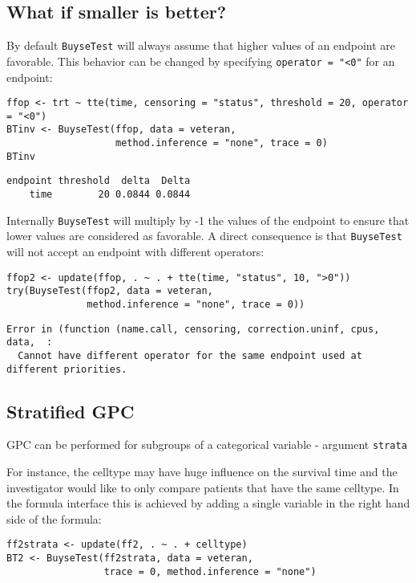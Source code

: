 \documentclass[12pt]{article}
\begin{document}
\clearpage

\subsection{What if smaller is better?}
\label{sec:orgaab0aa0}
By default \texttt{BuyseTest} will always assume that higher values of an
endpoint are favorable. This behavior can be changed by specifying \texttt{operator = "<0"}
for an endpoint:
\lstset{language=r,label= ,caption= ,captionpos=b,numbers=none}
\begin{lstlisting}
ffop <- trt ~ tte(time, censoring = "status", threshold = 20, operator = "<0")
BTinv <- BuyseTest(ffop, data = veteran, 
				   method.inference = "none", trace = 0)
BTinv
\end{lstlisting}

\begin{verbatim}
endpoint threshold  delta  Delta
    time        20 0.0844 0.0844
\end{verbatim}

Internally \texttt{BuyseTest} will multiply by -1 the values of the endpoint
to ensure that lower values are considered as favorable. A direct
consequence is that \texttt{BuyseTest} will not accept an endpoint with
different operators:
\lstset{language=r,label= ,caption= ,captionpos=b,numbers=none}
\begin{lstlisting}
ffop2 <- update(ffop, . ~ . + tte(time, "status", 10, ">0"))
try(BuyseTest(ffop2, data = veteran, 
			  method.inference = "none", trace = 0))
\end{lstlisting}

\begin{verbatim}
Error in (function (name.call, censoring, correction.uninf, cpus, data,  : 
  Cannot have different operator for the same endpoint used at different priorities.
\end{verbatim}

\subsection{Stratified GPC}
\label{sec:orge9e9da2}

GPC can be performed for subgroups of a categorical variable \hfill -
argument \texttt{strata}

\bigskip

 For instance, the celltype may have huge influence on the survival
time and the investigator would like to only compare patients that
have the same celltype. In the formula interface this is achieved by
adding a single variable in the right hand side of the formula:
\lstset{language=r,label= ,caption= ,captionpos=b,numbers=none}
\begin{lstlisting}
ff2strata <- update(ff2, . ~ . + celltype)
BT2 <- BuyseTest(ff2strata, data = veteran, 
				 trace = 0, method.inference = "none")
\end{lstlisting}
\end{document}
